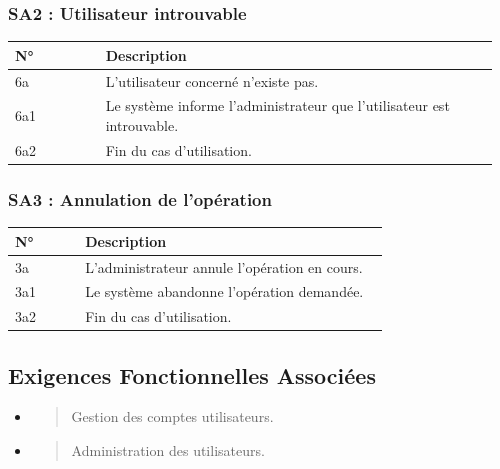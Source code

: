 \hypertarget{sa2-utilisateur-introuvable}{%
\subsubsection{SA2 : Utilisateur
introuvable}\label{sa2-utilisateur-introuvable}}

\begin{longtable}{@{}p{0.18\linewidth}p{0.78\linewidth}@{}}
\toprule
\rowcolors{2}{gray!10}{white}
\textbf{N°} & \textbf{Description} \\
\midrule
\endhead
6a & L'utilisateur concerné n'existe pas. \\
6a1 & Le système informe l'administrateur que l'utilisateur est
introuvable. \\
6a2 & Fin du cas d'utilisation. \\
\bottomrule
\end{longtable}

\hypertarget{sa3-annulation-de-lopuxe9ration-2}{%
\subsubsection{SA3 : Annulation de
l'opération}\label{sa3-annulation-de-lopuxe9ration-2}}

\begin{longtable}{@{}p{0.18\linewidth}p{0.78\linewidth}@{}}
\toprule
\rowcolors{2}{gray!10}{white}
\textbf{N°} & \textbf{Description} \\
\midrule
\endhead
3a & L'administrateur annule l'opération en cours. \\
3a1 & Le système abandonne l'opération demandée. \\
3a2 & Fin du cas d'utilisation. \\
\bottomrule
\end{longtable}

\hypertarget{exigences-fonctionnelles-associuxe9es-5}{%
\subsection{Exigences Fonctionnelles
Associées}\label{exigences-fonctionnelles-associuxe9es-5}}

\begin{itemize}
\item
  \begin{quote}
  Gestion des comptes utilisateurs.
  \end{quote}
\item
  \begin{quote}
  Administration des utilisateurs.
  \end{quote}
\end{itemize}


